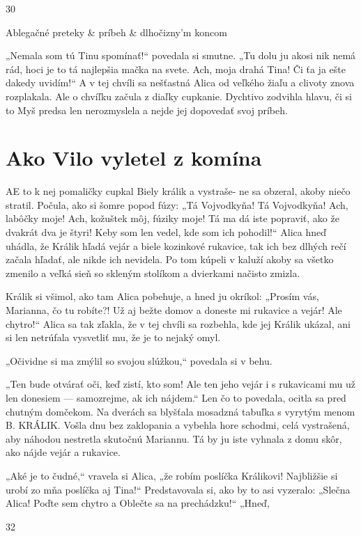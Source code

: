 \documentclass[12pt]{article}
\begin{document}
\begin{Parallel}[p]{}{}
{{30

Ablegačné preteky & príbeh & dlhočizny'm koncom

„Nemala som tú Tinu spomínať!“ povedala si smutne.
„Tu dolu ju akosi nik nemá rád, hoci je to tá najlepšia mačka
na svete. Ach, moja drahá Tina! Či ťa ja ešte dakedy
uvidím!“ A v tej chvíli sa nešťastná Alica od veľkého žiaľu
a clivoty znova rozplakala. Ale o chvíľku začula z diaľky
cupkanie. Dychtivo zodvihla hlavu, či si to Myš predsa len
nerozmyslela a nejde jej dopovedať svoj príbeh.

\section{Ako Vilo vyletel z komína}

AE to k nej pomaličky cupkal Biely králik a vystraše-
ne sa obzeral, akoby niečo stratil. Počula, ako si
šomre popod fúzy: „Tá Vojvodkyňa! Tá Vojvodkyňa! Ach,
labôčky moje! Ach, kožuštek môj, fúziky moje! Tá ma dá
iste popraviť, ako že dvakrát dva je štyri! Keby som len
vedel, kde som ich pohodil!“ Alica hneď uhádla, že Králik
hľadá vejár a biele kozinkové rukavice, tak ich bez dlhých
rečí začala hľadať, ale nikde ich nevidela. Po tom kúpeli
v kaluží akoby sa všetko zmenilo a veľká sieň so skleným
stolíkom a dvierkami načisto zmizla.

Králik si všimol, ako tam Alica pobehuje, a hned ju
okríkol: „Prosím vás, Marianna, čo tu robíte?! Už aj bežte
domov a doneste mi rukavice a vejár! Ale chytro!“ Alica sa
tak zľakla, že v tej chvíli sa rozbehla, kde jej Králik ukázal,
ani si len netrúfala vysvetliť mu, že je to nejaký omyl.

„Očividne si ma zmýlil so svojou slúžkou,“ povedala si
v behu.

„Ten bude otvárať oči, keď zistí, kto som! Ale ten jeho
vejár i s rukavicami mu už len donesiem — samozrejme, ak
ich nájdem.“ Len čo to povedala, ocitla sa pred chutným
domčekom. Na dverách sa blyšťala mosadzná tabuľka
s vyrytým menom B. KRÁLIK. Vošla dnu bez zaklopania
a vybehla hore schodmi, celá vystrašená, aby náhodou
nestretla skutočnú Mariannu. Tá by ju iste vyhnala z domu
skôr, ako nájde vejár a rukavice.

„Aké je to čudné,“ vravela si Alica, „že robím poslíčka
Králikovi! Najbližšie si urobí zo mňa poslíčka aj Tina!“
Predstavovala si, ako by to asi vyzeralo: „Slečna Alica!
Poďte sem chytro a Oblečte sa na prechádzku!“ „Hneď,

32

}}
\end{Parallel}
\end{document}

